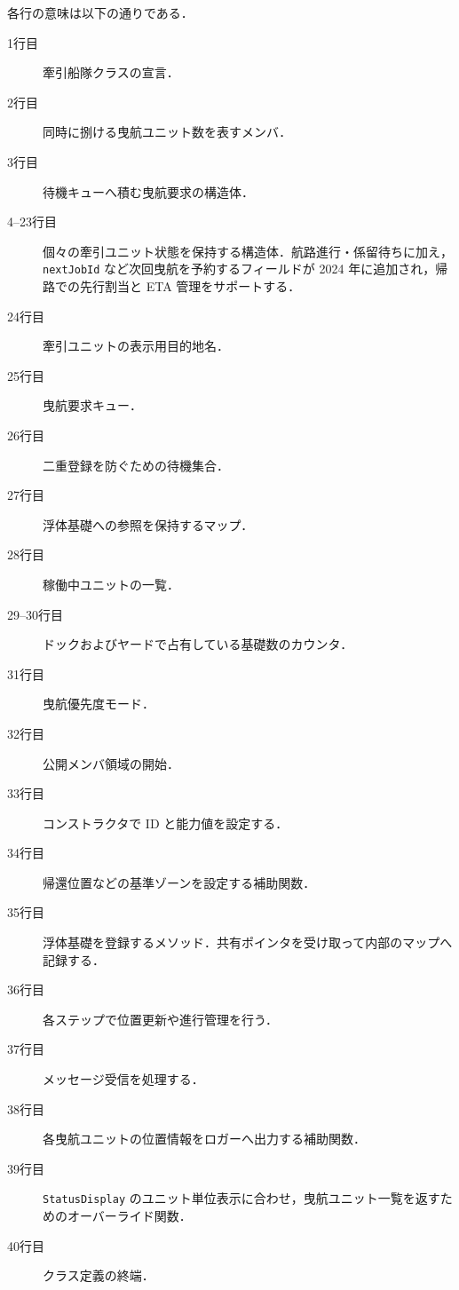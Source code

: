 \documentclass[10pt,letterpaper]{jsarticle}
\begin{document}
各行の意味は以下の通りである．
\begin{description}
  \item[1行目] 牽引船隊クラスの宣言．
  \item[2行目] 同時に捌ける曳航ユニット数を表すメンバ．
  \item[3行目] 待機キューへ積む曳航要求の構造体．
  \item[4--23行目] 個々の牽引ユニット状態を保持する構造体．航路進行・係留待ちに加え，\texttt{nextJobId} など次回曳航を予約するフィールドが 2024 年に追加され，帰路での先行割当と ETA 管理をサポートする．
  \item[24行目] 牽引ユニットの表示用目的地名．
  \item[25行目] 曳航要求キュー．
  \item[26行目] 二重登録を防ぐための待機集合．
  \item[27行目] 浮体基礎への参照を保持するマップ．
  \item[28行目] 稼働中ユニットの一覧．
  \item[29--30行目] ドックおよびヤードで占有している基礎数のカウンタ．
  \item[31行目] 曳航優先度モード．
  \item[32行目] 公開メンバ領域の開始．
  \item[33行目] コンストラクタで ID と能力値を設定する．
  \item[34行目] 帰還位置などの基準ゾーンを設定する補助関数．
  \item[35行目] 浮体基礎を登録するメソッド．共有ポインタを受け取って内部のマップへ記録する．
  \item[36行目] 各ステップで位置更新や進行管理を行う．
  \item[37行目] メッセージ受信を処理する．
  \item[38行目] 各曳航ユニットの位置情報をロガーへ出力する補助関数．
  \item[39行目] \texttt{StatusDisplay} のユニット単位表示に合わせ，曳航ユニット一覧を返すためのオーバーライド関数．
  \item[40行目] クラス定義の終端．
\end{description}
\end{document}

